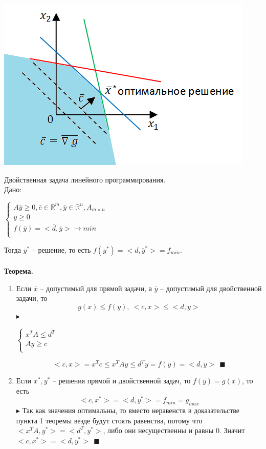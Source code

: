 \documentclass[12pt]{article}
\theoremstyle{definition}
\numberwithin{equation}{section}
\begin{document}
	\begin{center}
		\includegraphics[scale=0.84]{l18_3.png}\\
	\end{center}
	Двойственная задача линейного программирования.\\
	Дано:
	\begin{center}
		$
		\left\{
		\begin{array}{lcl}
		A\bar y\geqslant 0, \bar c\in \mathbb{R}^m, \bar y \in \mathbb{R}^n, A_{m\times n}\\
		\bar y \geqslant 0\\
		f(\bar y)=<\bar d, \bar y> \to min\\
		\end{array}
		\right.
		$
	\end{center}
	Тогда $y^*$ -- решение, то есть $f(y^*)=<d, \bar y^*>=f_{min}$.\\
	\\
	\textbf{Теорема.} 
	\begin{enumerate}
		\item Если $\bar x$ -- допустимый для прямой задачи, а $\bar y$ -- допустимый для двойственной задачи, то $$g(x)\leqslant f(y), ~<c, x>\leqslant <d, y>$$
		$\blacktriangleright$
		\begin{center}    
			$
			\left\{
			\begin{array}{lcl}
			x^TA \leqslant d^T\\
			Ay\geqslant c\\
			\end{array}
			\right.
			$
		\end{center}
		$$<c, x>=x^Tc\leqslant x^TAy \leqslant d^Ty=f(y)=<d, y>~~\blacksquare$$
		\item Если $x^*, y^*$ -- решения прямой и двойственной задач, то $f(y)=g(x)$, то есть $$<c, x^*>=<d, y^*>=f_{min}=g_{max}$$
		$\blacktriangleright$ Так как значения оптимальны, то вместо неравенств в доказательстве пункта 1 теоремы везде будут стоять равенства, потому что $<x^TA, y^*>=<d^T, y^*>$, либо они несущественны и равны 0. Значит $<c, x^*>=<d, y^*>~~\blacksquare$
	\end{enumerate}
\end{document}
